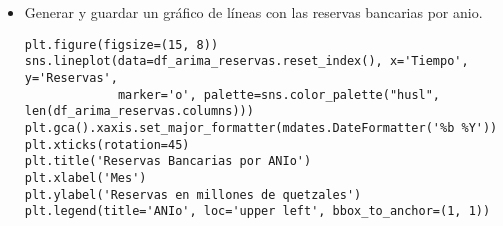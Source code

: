 \begin{itemize}
  \item Generar y guardar un gráfico de líneas con las reservas bancarias por anio.
\begin{lstlisting}
plt.figure(figsize=(15, 8))
sns.lineplot(data=df_arima_reservas.reset_index(), x='Tiempo', y='Reservas', 
             marker='o', palette=sns.color_palette("husl", len(df_arima_reservas.columns)))
plt.gca().xaxis.set_major_formatter(mdates.DateFormatter('%b %Y'))
plt.xticks(rotation=45)
plt.title('Reservas Bancarias por ANIo')
plt.xlabel('Mes')
plt.ylabel('Reservas en millones de quetzales')
plt.legend(title='ANIo', loc='upper left', bbox_to_anchor=(1, 1))
\end{lstlisting}
\end{itemize}

